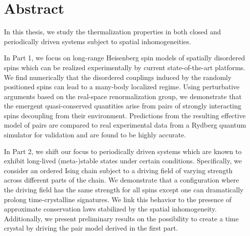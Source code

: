 \begingroup
\let\clearpage\relax
\let\cleardoublepage\relax
\let\cleardoublepage\relax

\chapter*{Abstract}

In this thesis, we study the thermalization properties in both closed and periodically driven systems subject to spatial inhomogeneities. 

In Part 1, we focus on long-range Heisenberg spin models of spatially disordered spins which can be realized experimentally by current state-of-the-art platforms.
We find numerically that the disordered couplings induced by the randomly positioned spins can lead to a many-body localized regime. Using perturbative arguments based on the real-space renormalization group, we demonstrate that the emergent quasi-conserved quantities arise from pairs of strongly interacting spins decoupling from their environment. Predictions from the resulting effective model of pairs are compared to real experimental data from a Rydberg quantum simulator for validation and are found to be highly accurate.

In Part 2, we shift our focus to periodically driven systems which are known to exhibit long-lived (meta-)stable states under certain conditions. Specifically, we consider an ordered Ising chain subject to a driving field of varying strength across different parts of the chain. We demonstrate that a configuration where the driving field has the same strength for all spins except one can dramatically prolong time-crystalline signatures. We link this behavior to the presence of approximate conservation laws stabilized by the spatial inhomogeneity. Additionally, we present preliminary results on the possibility to create a time crystal by driving the pair model derived in the first part.

